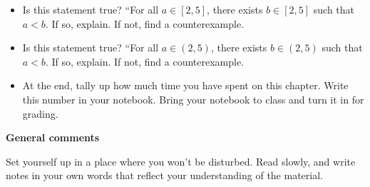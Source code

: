 \begin{itemize}
\item Is this statement true?  ``For all $a \in [2,5]$, there exists $b \in [2,5]$ such that $a < b$.  If so, explain.  If not, find a counterexample.

\item Is this statement true?  ``For all $a \in (2,5)$, there exists $b \in (2,5)$ such that $a < b$.  If so, explain.  If not, find a counterexample.

\item At the end, tally up how much time you have spent on this chapter.
Write this number in your notebook.
Bring your notebook to class and turn it in for grading.
\end{itemize}

\noindent
{\bf General comments}

Set yourself up in a place where you won't be disturbed.
Read slowly, and write notes in your own words that reflect your understanding of the material.
